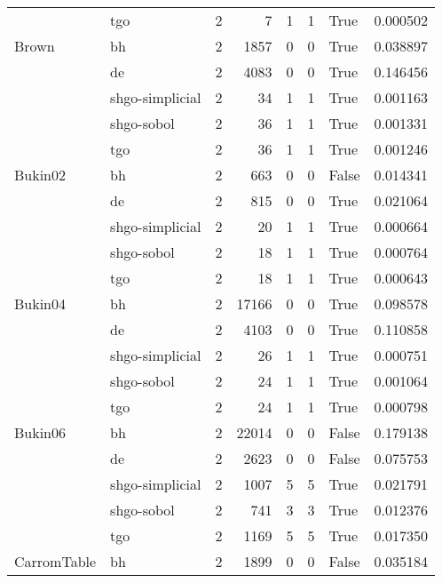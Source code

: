 \begin{longtable}{llrrrrlr}
         & tgo &     2 &        7 &      1 &       1 &    True &    0.000502 \\
Brown & bh &     2 &     1857 &      0 &       0 &    True &    0.038897 \\
         & de &     2 &     4083 &      0 &       0 &    True &    0.146456 \\
         & shgo-simplicial &     2 &       34 &      1 &       1 &    True &    0.001163 \\
         & shgo-sobol &     2 &       36 &      1 &       1 &    True &    0.001331 \\
         & tgo &     2 &       36 &      1 &       1 &    True &    0.001246 \\
Bukin02 & bh &     2 &      663 &      0 &       0 &   False &    0.014341 \\
         & de &     2 &      815 &      0 &       0 &    True &    0.021064 \\
         & shgo-simplicial &     2 &       20 &      1 &       1 &    True &    0.000664 \\
         & shgo-sobol &     2 &       18 &      1 &       1 &    True &    0.000764 \\
         & tgo &     2 &       18 &      1 &       1 &    True &    0.000643 \\
Bukin04 & bh &     2 &    17166 &      0 &       0 &    True &    0.098578 \\
         & de &     2 &     4103 &      0 &       0 &    True &    0.110858 \\
         & shgo-simplicial &     2 &       26 &      1 &       1 &    True &    0.000751 \\
         & shgo-sobol &     2 &       24 &      1 &       1 &    True &    0.001064 \\
         & tgo &     2 &       24 &      1 &       1 &    True &    0.000798 \\
Bukin06 & bh &     2 &    22014 &      0 &       0 &   False &    0.179138 \\
         & de &     2 &     2623 &      0 &       0 &   False &    0.075753 \\
         & shgo-simplicial &     2 &     1007 &      5 &       5 &    True &    0.021791 \\
         & shgo-sobol &     2 &      741 &      3 &       3 &    True &    0.012376 \\
         & tgo &     2 &     1169 &      5 &       5 &    True &    0.017350 \\
CarromTable & bh &     2 &     1899 &      0 &       0 &   False &    0.035184 \\

\end{longtable}
